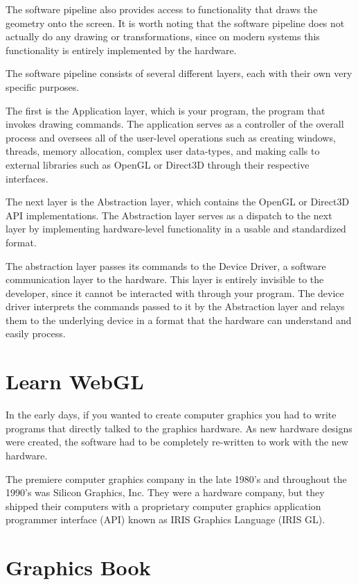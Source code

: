 The software pipeline also provides access to functionality that draws
the geometry onto the screen. It is worth noting that the software pipeline
does not actually do any drawing or transformations, since on modern systems
this functionality is entirely implemented by the hardware.

The software pipeline consists of several different layers, each with their
own very specific purposes.

The first is the Application layer, which is your program, the program that
invokes drawing commands. The application serves as a controller of the overall
process and oversees all of the user-level operations such as creating windows,
threads, memory allocation, complex user data-types, and making calls to external
libraries such as OpenGL or Direct3D through their respective interfaces.

The next layer is the Abstraction layer, which contains the OpenGL or Direct3D
API implementations.
The Abstraction layer serves as a dispatch to the next layer by implementing
hardware-level functionality in a usable and standardized format.

The abstraction layer passes its commands to the Device Driver, a software
communication layer to the hardware. This layer is entirely invisible to the
developer, since it cannot be interacted with through your program.
The device driver interprets the commands passed to it by the Abstraction
layer and relays them to the underlying device in a format that the hardware
can understand and easily process.

\section{Learn WebGL}

In the early days, if you wanted to create computer graphics you had to
write programs that directly talked to the graphics hardware. As new hardware
designs were created, the software had to be completely re-written to work with
the new hardware.

The premiere computer graphics company in the late 1980's and throughout
the 1990's was Silicon Graphics, Inc. They were a hardware company, but
they shipped their computers with a proprietary computer graphics application
programmer interface (API) known as IRIS Graphics Language (IRIS GL).

\section{Graphics Book}

